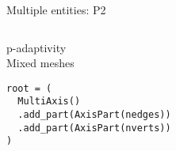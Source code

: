 \documentclass{beamer}
\newcommand{\checked}{\makebox[0pt][l]{$\square$}\raisebox{.15ex}{\hspace{0.1em}$\checkmark$}}
\begin{document}
\begin{frame}[fragile]{Multiple entities: P2}
\begin{columns}
    \hfill

    \begin{column}{.5\textwidth}
      \checked p-adaptivity\footnotemark \\
      \checked Mixed meshes\footnotemark[\value{footnote}]

      \vspace{2em}

      \begin{verbatim}
root = (
  MultiAxis()
  .add_part(AxisPart(nedges))
  .add_part(AxisPart(nverts))
)
      \end{verbatim}
    \end{column}
  \end{columns}

\end{frame}
\end{document}
